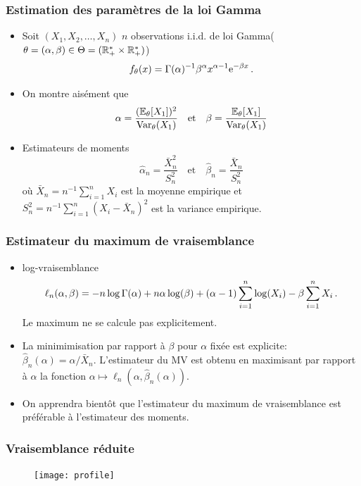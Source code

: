 \begin{frame}
\frametitle{Estimation des paramètres de la loi Gamma}
\begin{itemize}
\item Soit $(X_1,X_2,\dots,X_n)$ $n$ observations i.i.d. de loi Gamma($\theta=(\alpha,\beta) \in \Theta= (\mathbb{R}^*_+ \times \mathbb{R}_+^*)$)
\[
f_\theta(x) = \Gamma(\alpha)^{-1} \beta^\alpha x^{\alpha-1} \mathrm{e}^{-\beta x} \,.
\]
\item On montre aisément que
\[
\alpha = \frac{(\operatorname{{\mathbb E}}_\theta[X_1])^2}{\operatorname{\mathrm{Var}}_\theta(X_1)} \quad \text{et} \quad \beta = \frac{\operatorname{{\mathbb E}}_\theta[X_1]}{\operatorname{\mathrm{Var}}_\theta(X_1)}
\]
\item Estimateurs de moments
\[
\hat{\alpha}_n = \frac{\bar{X}^2_n}{S_n^2} \quad \text{et} \quad \hat{\beta}_n= \frac{\bar{X}_n}{S_n^2}
\]
où $\bar{X}_n= n ^{-1} \sum_{i=1}^n X_i$ est la \alert{moyenne empirique} et $S_n^2= n^{-1} \sum_{i=1}^n (X_i - \bar{X}_n)^2$ est \alert{la variance empirique}.
\end{itemize}
\end{frame}

\begin{frame}
\frametitle{Estimateur du maximum de vraisemblance}
\begin{itemize}
\item \alert{log-vraisemblance}
\[
\ell_n(\alpha,\beta)= - n \log \Gamma(\alpha) + n \alpha \log(\beta) + (\alpha-1) \sum_{i=1}^n \log(X_i) - \beta \sum_{i=1}^n X_i \,.
\]
\alert{Le maximum ne se calcule pas explicitement.}
\item La minimimisation par rapport à $\beta$  pour $\alpha$ fixée est explicite: $\hat{\beta}_n(\alpha)= \alpha / \bar{X}_n$. L'estimateur du MV est obtenu en maximisant par rapport à $\alpha$ la fonction $\alpha \mapsto \ell_n(\alpha,\hat{\beta}_n(\alpha))$.
\item On apprendra bientôt que l'estimateur du maximum de vraisemblance est préférable à l'estimateur des moments.
\end{itemize}
\end{frame}

\begin{frame}
\frametitle{Vraisemblance réduite}
\begin{figure}
  \centering
  \texttt{[image: profile]}\\
\end{figure}

\end{frame}

